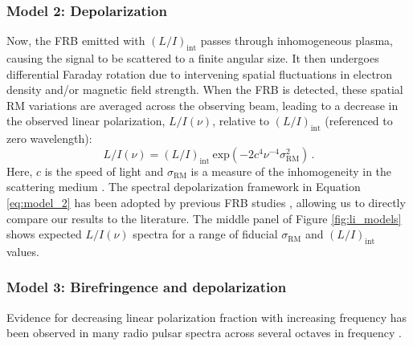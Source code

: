 \documentclass[twocolumn, linenumbers]{aastex701}
\begin{document}
\subsubsection{Model 2: Depolarization} \label{subsec:model_2}
Now, the FRB emitted with $(L/I)_\mathrm{int}$ passes through inhomogeneous plasma, causing the signal to be scattered to a finite angular size. It then undergoes differential Faraday rotation due to intervening spatial fluctuations in electron density and/or magnetic field strength. When the FRB is detected, these spatial RM variations are averaged across the observing beam, leading to a decrease in the observed linear polarization, $L/I (\nu)$, relative to $(L/I)_\mathrm{int}$ (referenced to zero wavelength):
\begin{equation}
L/I (\nu) = (L/I)_\mathrm{int}~\mathrm{exp} \left(-2 c^4 \nu^{-4} \sigma_\mathrm{RM}^2 \right)\,. \label{eq:model_2}
\end{equation}
Here, $c$ is the speed of light and $\sigma_\mathrm{RM}$ is a measure of the inhomogeneity in the scattering medium \citep{1966MNRAS.133...67B}. The spectral depolarization framework in Equation \ref{eq:model_2} has been adopted by previous FRB studies \citep[e.g.,][]{2022Sci...375.1266F, 2025MNRAS.tmp.1894U, 2026ApJ..1000L..53P}, allowing us to directly compare our results to the literature. The middle panel of Figure \ref{fig:li_models} shows expected $L/I (\nu)$ spectra for a range of fiducial $\sigma_\mathrm{RM}$ and $(L/I)_\mathrm{int}$ values.

\subsubsection{Model 3: Birefringence and depolarization} \label{subsec:model_3}
Evidence for decreasing linear polarization fraction with increasing frequency has been observed in many radio pulsar spectra across several octaves in frequency \citep[e.g.,][]{1981A&A...100..107M, 1998MNRAS.301..235G, 2008MNRAS.388..261J, 2015A&A...576A..62N}. 
\end{document}
